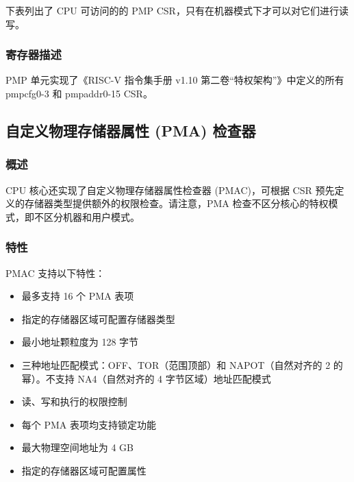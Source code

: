\documentclass[main\_\_CN.tex]{subfiles}
\begin{document}
下表列出了 CPU 可访问的的 PMP CSR，只有在机器模式下才可以对它们进行读写。




\subsubsection{寄存器描述}
\label{sec:riscvcpu-pmp-reg-desc}

PMP 单元实现了《RISC-V 指令集手册 v1.10 第二卷“特权架构”》中定义的所有 pmpcfg0-3 和 pmpaddr0-15 CSR。




\newpage
\subsection{自定义物理存储器属性 (PMA) 检查器}
\label{sec:riscvcpu-pma}
\subsubsection{概述}
\label{sec:riscvcpu-pma-overview}
CPU 核心还实现了自定义物理存储器属性检查器 (PMAC)，可根据 CSR 预先定义的存储器类型提供额外的权限检查。请注意，PMA 检查不区分核心的特权模式，即不区分机器和用户模式。


\subsubsection{特性}
\label{sec:riscvcpu-pma-features}

PMAC 支持以下特性：

\begin{itemize}
    \item 最多支持 16 个 PMA 表项
    \item 指定的存储器区域可配置存储器类型
    \item 最小地址颗粒度为 128 字节
    \item 三种地址匹配模式：OFF、TOR（范围顶部）和 NAPOT（自然对齐的 2 的幂）。不支持 NA4（自然对齐的 4 字节区域）地址匹配模式
    \item 读、写和执行的权限控制
    \item 每个 PMA 表项均支持锁定功能
    \item 最大物理空间地址为 4 GB
    \item 指定的存储器区域可配置属性
\end{itemize}
\end{document}
